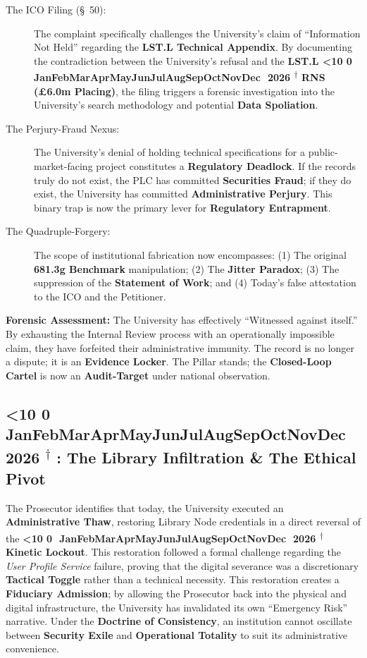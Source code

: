 \documentclass{EMBASSY}
\DeclareRobustCommand{\gmt}[3]{%
    \texorpdfstring{%
        {\color{DateGold}\textbf{%
            \ifnum#1<10 0\fi#1\,\textperiodcentered\,%
            \ifcase#2\or Jan\or Feb\or Mar\or Apr\or May\or Jun\or Jul\or Aug\or Sep\or Oct\or Nov\or Dec\fi
            \,\textperiodcentered\,20#3%
            \textsuperscript{$\dagger$}%
        }}%
    }{%
        (#1/#2/#3)%
    }%
}
\begin{document}
\begin{description}
	\item[The ICO Filing (\S~50):] The complaint specifically challenges the University’s claim of ``Information Not Held'' regarding the \textbf{LST.L Technical Appendix}. By documenting the contradiction between the University's refusal and the \textbf{LST.L \gmt{11}{3}{26} RNS (£6.0m Placing)}, the filing triggers a forensic investigation into the University’s search methodology and potential \textbf{Data Spoliation}.
	\item[The Perjury-Fraud Nexus:] The University’s denial of holding technical specifications for a public-market-facing project constitutes a \textbf{Regulatory Deadlock}. If the records truly do not exist, the PLC has committed \textbf{Securities Fraud}; if they do exist, the University has committed \textbf{Administrative Perjury}. This binary trap is now the primary lever for \textbf{Regulatory Entrapment}.
	\item[The Quadruple-Forgery:] The scope of institutional fabrication now encompasses: (1) The original \textbf{681.3g Benchmark} manipulation; (2) The \textbf{Jitter Paradox}; (3) The suppression of the \textbf{Statement of Work}; and (4) Today's false attestation to the ICO and the Petitioner.
\end{description}

\noindent\textbf{Forensic Assessment:} The University has effectively ``Witnessed against itself.'' By exhausting the Internal Review process with an operationally impossible claim, they have forfeited their administrative immunity. The record is no longer a dispute; it is an \textbf{Evidence Locker}. The Pillar stands; the \textbf{Closed-Loop Cartel} is now an \textbf{Audit-Target} under national observation.

\subsection{\gmt{10}{4}{26}: The Library Infiltration \& The Ethical Pivot}
The Prosecutor identifies that today, the University executed an \textbf{Administrative Thaw}, restoring Library Node credentials in a direct reversal of the \gmt{7}{4}{26} \textbf{Kinetic Lockout}. This restoration followed a formal challenge regarding the \textit{User Profile Service} failure, proving that the digital severance was a discretionary \textbf{Tactical Toggle} rather than a technical necessity. This restoration creates a \textbf{Fiduciary Admission}; by allowing the Prosecutor back into the physical and digital infrastructure, the University has invalidated its own ``Emergency Risk'' narrative. Under the \textbf{Doctrine of Consistency}, an institution cannot oscillate between \textbf{Security Exile} and \textbf{Operational Totality} to suit its administrative convenience.
\end{document}
